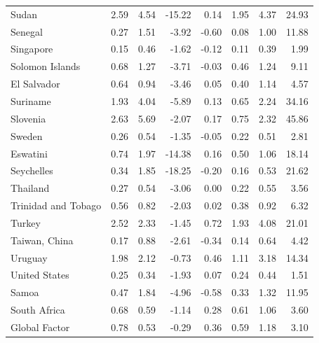 \begin{longtable}{lrrrrrrr}
Sudan & 2.59 & 4.54 & -15.22 & 0.14 & 1.95 & 4.37 & 24.93 \\
Senegal & 0.27 & 1.51 & -3.92 & -0.60 & 0.08 & 1.00 & 11.88 \\
Singapore & 0.15 & 0.46 & -1.62 & -0.12 & 0.11 & 0.39 & 1.99 \\
Solomon Islands & 0.68 & 1.27 & -3.71 & -0.03 & 0.46 & 1.24 & 9.11 \\
El Salvador & 0.64 & 0.94 & -3.46 & 0.05 & 0.40 & 1.14 & 4.57 \\
Suriname & 1.93 & 4.04 & -5.89 & 0.13 & 0.65 & 2.24 & 34.16 \\
Slovenia & 2.63 & 5.69 & -2.07 & 0.17 & 0.75 & 2.32 & 45.86 \\
Sweden & 0.26 & 0.54 & -1.35 & -0.05 & 0.22 & 0.51 & 2.81 \\
Eswatini & 0.74 & 1.97 & -14.38 & 0.16 & 0.50 & 1.06 & 18.14 \\
Seychelles & 0.34 & 1.85 & -18.25 & -0.20 & 0.16 & 0.53 & 21.62 \\
Thailand & 0.27 & 0.54 & -3.06 & 0.00 & 0.22 & 0.55 & 3.56 \\
Trinidad and Tobago & 0.56 & 0.82 & -2.03 & 0.02 & 0.38 & 0.92 & 6.32 \\
Turkey & 2.52 & 2.33 & -1.45 & 0.72 & 1.93 & 4.08 & 21.01 \\
Taiwan, China & 0.17 & 0.88 & -2.61 & -0.34 & 0.14 & 0.64 & 4.42 \\
Uruguay & 1.98 & 2.12 & -0.73 & 0.46 & 1.11 & 3.18 & 14.34 \\
United States & 0.25 & 0.34 & -1.93 & 0.07 & 0.24 & 0.44 & 1.51 \\
Samoa & 0.47 & 1.84 & -4.96 & -0.58 & 0.33 & 1.32 & 11.95 \\
South Africa & 0.68 & 0.59 & -1.14 & 0.28 & 0.61 & 1.06 & 3.60 \\
Global Factor & 0.78 & 0.53 & -0.29 & 0.36 & 0.59 & 1.18 & 3.10 \\
\end{longtable}
